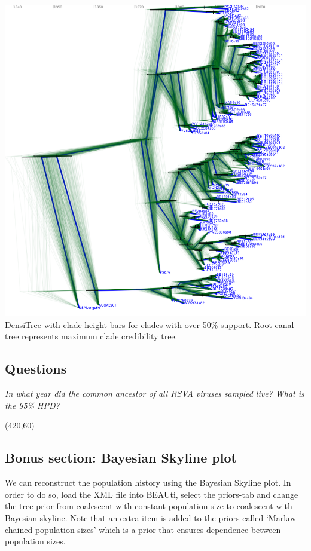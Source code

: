 \documentclass[12pt]{article}
\begin{document}
\includegraphics[width=\textwidth]{figures/DensiTree.pdf}
DensiTree with clade height bars for clades with over 50\% support.
Root canal tree represents maximum clade credibility tree.


\subsection*{Questions}

\textit{In what year did the common ancestor of all RSVA viruses sampled live? What is the
95\% HPD?}

\framebox(420,60){}


\subsection*{Bonus section: Bayesian Skyline plot}

We can reconstruct the population history using the Bayesian Skyline plot. In order to do so,
load the XML file into BEAUti, select the priors-tab and change the tree prior from 
coalescent with constant population size to coalescent with Bayesian skyline.
Note that an extra item is added to the priors called `Markov chained population sizes'
which is a prior that ensures dependence between population sizes.
\end{document}
